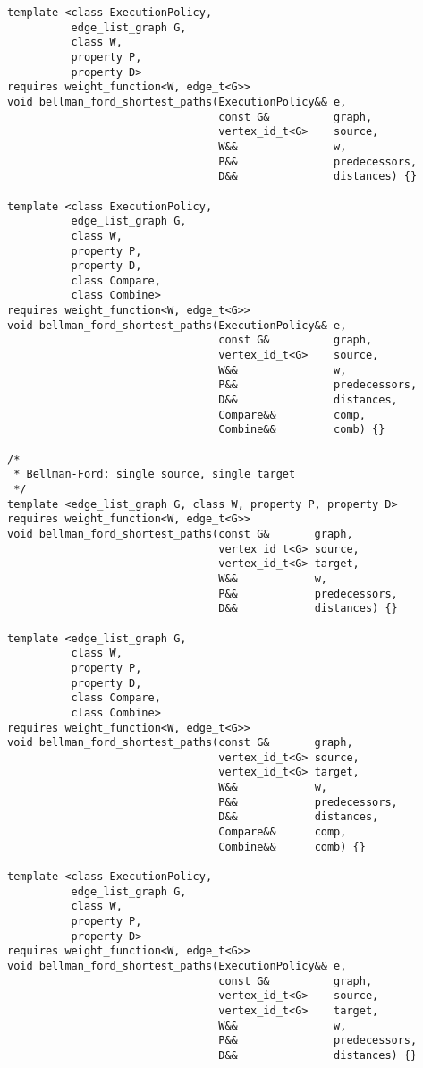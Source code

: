 \begin{lstlisting}
template <class ExecutionPolicy,
          edge_list_graph G,
          class W,
          property P,
          property D>
requires weight_function<W, edge_t<G>>
void bellman_ford_shortest_paths(ExecutionPolicy&& e,
                                 const G&          graph,
                                 vertex_id_t<G>    source,
                                 W&&               w,
                                 P&&               predecessors,
                                 D&&               distances) {}

template <class ExecutionPolicy,
          edge_list_graph G,
          class W,
          property P,
          property D,
          class Compare,
          class Combine>
requires weight_function<W, edge_t<G>>
void bellman_ford_shortest_paths(ExecutionPolicy&& e,
                                 const G&          graph,
                                 vertex_id_t<G>    source,
                                 W&&               w,
                                 P&&               predecessors,
                                 D&&               distances,
                                 Compare&&         comp,
                                 Combine&&         comb) {}

/*
 * Bellman-Ford: single source, single target
 */
template <edge_list_graph G, class W, property P, property D>
requires weight_function<W, edge_t<G>>
void bellman_ford_shortest_paths(const G&       graph,
                                 vertex_id_t<G> source,
                                 vertex_id_t<G> target,
                                 W&&            w,
                                 P&&            predecessors,
                                 D&&            distances) {}

template <edge_list_graph G,
          class W,
          property P,
          property D,
          class Compare,
          class Combine>
requires weight_function<W, edge_t<G>>
void bellman_ford_shortest_paths(const G&       graph,
                                 vertex_id_t<G> source,
                                 vertex_id_t<G> target,
                                 W&&            w,
                                 P&&            predecessors,
                                 D&&            distances,
                                 Compare&&      comp,
                                 Combine&&      comb) {}

template <class ExecutionPolicy,
          edge_list_graph G,
          class W,
          property P,
          property D>
requires weight_function<W, edge_t<G>>
void bellman_ford_shortest_paths(ExecutionPolicy&& e,
                                 const G&          graph,
                                 vertex_id_t<G>    source,
                                 vertex_id_t<G>    target,
                                 W&&               w,
                                 P&&               predecessors,
                                 D&&               distances) {}


\end{lstlisting}
